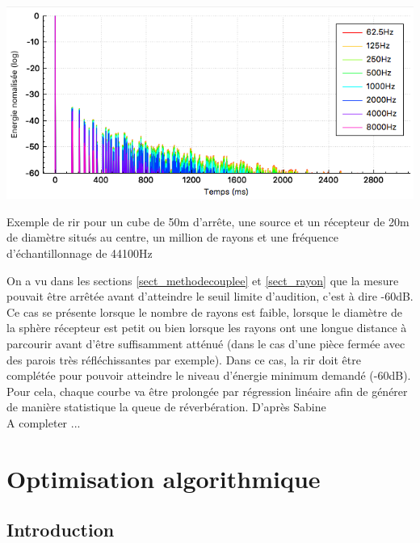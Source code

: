  \begin{figureth}
	\includegraphics[width=0.9\linewidth]{images/rir}
	\caption{Exemple de \gls{rir} pour un cube de 50m d'arrête, une source et un récepteur de 20m de diamètre situés au centre, un million de rayons et une fréquence d'échantillonnage de 44100Hz}
\end{figureth}

On a vu dans les sections \ref{sect_methodecouplee} et \ref{sect_rayon} que la mesure pouvait être arrêtée avant d'atteindre le seuil limite d'audition, c'est à dire -60dB. Ce cas se présente lorsque le nombre de rayons est faible, lorsque le diamètre de la sphère récepteur est petit ou bien lorsque les rayons ont une longue distance à parcourir avant d'être suffisamment atténué (dans le cas d'une pièce fermée avec des parois très réfléchissantes par exemple). Dans ce cas, la \gls{rir} doit être complétée pour pouvoir atteindre le niveau d'énergie minimum demandé (-60dB). Pour cela, chaque courbe va être prolongée par régression linéaire afin de générer de manière statistique la queue de réverbération. D'après Sabine \cite[]{sabine} \\
A completer ...

\chapter{Optimisation algorithmique}
	\minitoc
	\newpage
	
\section{Introduction} \label{complexite}

